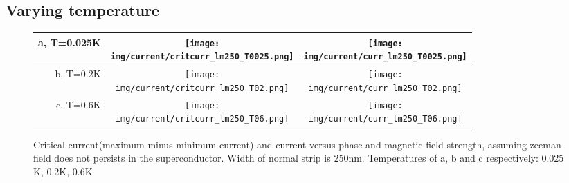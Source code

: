 \documentclass[10pt,a4paper]{article}
\newcommand{\img}{./images}
\begin{document}
	\subsection{Varying temperature}
		\begin{figure}
			\begin{tabular}{rcc}
				a, T=0.025K&\texttt{[image: \\img/current/critcurr\_lm250\_T0025.png]}&
				\texttt{[image: \\img/current/curr\_lm250\_T0025.png]}\\
				\hline
				b, T=0.2K&\texttt{[image: \\img/current/critcurr\_lm250\_T02.png]}&
				\texttt{[image: \\img/current/curr\_lm250\_T02.png]}\\
				\hline
				c, T=0.6K&\texttt{[image: \\img/current/critcurr\_lm250\_T06.png]}&
				\texttt{[image: \\img/current/curr\_lm250\_T06.png]}\\
				\hline
			\end{tabular}
			\caption{Critical current(maximum minus minimum current) and current versus phase and magnetic field strength, assuming zeeman field does not persists in the superconductor. Width of normal strip is 250nm. Temperatures of a, b and c respectively: 0.025 K, 0.2K, 0.6K}
		\end{figure}
\clearpage
\printglossaries
\end{document}
